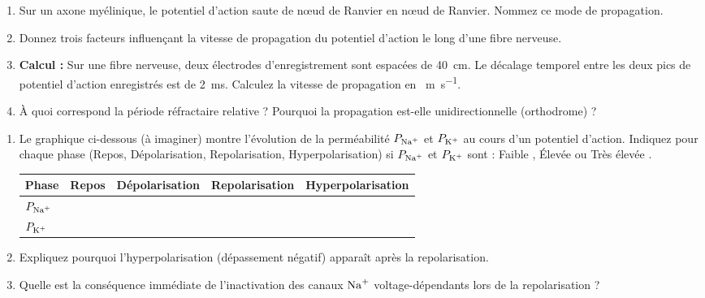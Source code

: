 \documentclass[11pt]{article}
\begin{document}
\begin{exercice}
\begin{enumerate}
    \item Sur un axone myélinique, le potentiel d'action saute de nœud de Ranvier en nœud de Ranvier. Nommez ce mode de propagation.
    \item Donnez trois facteurs influençant la vitesse de propagation du potentiel d'action le long d'une fibre nerveuse.
    \item \textbf{Calcul :} Sur une fibre nerveuse, deux électrodes d'enregistrement sont espacées de \SI{40}{\centi\meter}. Le décalage temporel entre les deux pics de potentiel d'action enregistrés est de \SI{2}{\milli\second}. Calculez la vitesse de propagation en \SI{}{\meter\per\second}.
    \item À quoi correspond la période réfractaire relative ? Pourquoi la propagation est-elle unidirectionnelle (orthodrome) ?
\end{enumerate}
\end{exercice}

\begin{exercice}
\begin{enumerate}
    \item Le graphique ci-dessous (à imaginer) montre l'évolution de la perméabilité $P_{\ce{Na+}}$ et $P_{\ce{K+}}$ au cours d'un potentiel d'action. Indiquez pour chaque phase (Repos, Dépolarisation, Repolarisation, Hyperpolarisation) si $P_{\ce{Na+}}$ et $P_{\ce{K+}}$ sont : \og Faible \fg, \og Élevée \fg ou \og Très élevée \fg.
    \begin{tabularx}{\linewidth}{lcccc}
        \toprule
        \textbf{Phase} & \textbf{Repos} & \textbf{Dépolarisation} & \textbf{Repolarisation} & \textbf{Hyperpolarisation} \\
        \midrule
        $P_{\ce{Na+}}$ & & & & \\
        $P_{\ce{K+}}$ & & & & \\
        \bottomrule
    \end{tabularx}
    \item Expliquez pourquoi l'hyperpolarisation (dépassement négatif) apparaît après la repolarisation.
    \item Quelle est la conséquence immédiate de l'inactivation des canaux $\ce{Na+}$ voltage-dépendants lors de la repolarisation ?
\end{enumerate}
\end{exercice}
\end{document}
